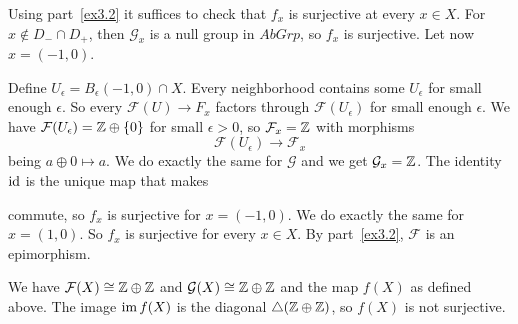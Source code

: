 \begin{exercise}{3}
\begin{enumerate}
{            Using part~\ref{ex3.2} it suffices to check that $f_x$ is surjective
            at every $x \in X$. For $x \notin D_- \cap D_+$, then
            $\mathcal{G}_x$ is a null group in $AbGrp$, so $f_x$ is surjective.
            Let now $x = (-1, 0)$.

            Define $U_\epsilon = B_\epsilon(-1, 0) \cap X$. Every neighborhood
            contains some $U_\epsilon$ for small enough $\epsilon$. So every
            $\mathcal{F}(U) \rightarrow F_x$ factors through
            $\mathcal{F}(U_\epsilon)$ for small enough $\epsilon$. We have
            $\mathcal{F}(U_\epsilon) = \mathbb{Z} \oplus \{0\}$ for small $\epsilon >
            0$, so $\mathcal{F}_x = \mathbb{Z}$ with morphisms
            \begin{equation*}
                \mathcal{F}(U_\epsilon) \rightarrow \mathcal{F}_x
            \end{equation*}
            being $a \oplus 0 \mapsto a$. We do exactly the same for
            $\mathcal{G}$ and we get $\mathcal{G}_x = \mathbb{Z}$. The identity $\operatorname{id}$ is
            the unique map that makes


            commute, so $f_x$ is surjective for $x = (-1, 0)$. We do exactly the
            same for $x = (1, 0)$. So $f_x$ is surjective for every $x \in X$. By
            part~\ref{ex3.2}, $\mathcal{F}$ is an epimorphism.

            We have $\mathcal{F}(X) \cong \mathbb{Z} \oplus \mathbb{Z}$ and $\mathcal{G}(X)
            \cong \mathbb{Z} \oplus \mathbb{Z}$ and the map $f(X)$ as defined above. The image
            $\operatorname{im} f(X)$ is the diagonal $\triangle (\mathbb{Z} \oplus \mathbb{Z})$, so $f(X)$ is
            not surjective.
            }
    \end{enumerate}
\end{exercise}

